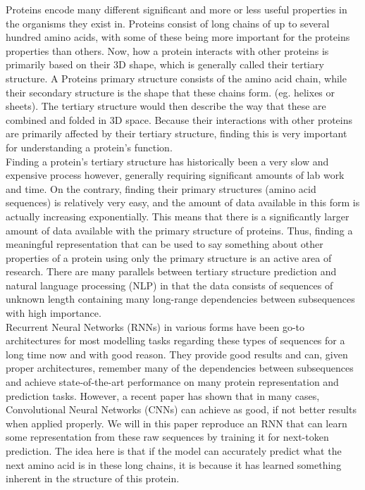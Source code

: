 %
Proteins encode many different significant and more or less useful properties in the organisms they exist in. Proteins consist of long chains of up to several hundred amino acids, with some of these being more important for the proteins properties than others. Now, how a protein interacts with other proteins is primarily based on their $3$D shape, which is generally called their tertiary structure. A Proteins primary structure consists of the amino acid chain, while their secondary structure is the shape that these chains form. (eg. helixes or sheets). The tertiary structure would then describe the way that these are combined and folded in $3$D space. Because their interactions with other proteins are primarily affected by their tertiary structure, finding this is very important for understanding a protein's function. \\

\noindent
Finding a protein's tertiary structure has historically been a very slow and expensive process however, generally requiring significant amounts of lab work and time. On the contrary, finding their primary structures (amino acid sequences) is relatively very easy, and the amount of data available in this form is actually increasing exponentially.\cite{seqcount} This means that there is a significantly larger amount of data available with the primary structure of proteins. Thus, finding a meaningful representation that can be used to say something about other properties of a protein using only the primary structure is an active area of research. There are many parallels between tertiary structure prediction and natural language processing (NLP) in that the data consists of sequences of unknown length containing many long-range dependencies between subsequences with high importance.\\

\noindent
Recurrent Neural Networks (RNNs) in various forms have been go-to architectures for most modelling tasks regarding these types of sequences for a long time now and with good reason. They provide good results and can, given proper architectures, remember many of the dependencies between subsequences and achieve state-of-the-art performance on many protein representation and prediction tasks. However, a recent paper has shown that in many cases, Convolutional Neural Networks (CNNs) can achieve as good, if not better results when applied properly.\cite{intro} We will in this paper reproduce an RNN that can learn some representation from these raw sequences by training it for next-token prediction.\cite{unirep} The idea here is that if the model can accurately predict what the next amino acid is in these long chains, it is because it has learned something inherent in the structure of this protein.\\

